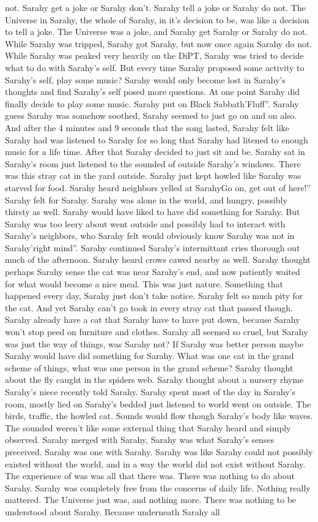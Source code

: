 \documentclass[12pt]{book}
\begin{document}
not. Sarahy get a joke or Sarahy don't. Sarahy tell a joke or Sarahy do not. The Universe in Sarahy, the whole of Sarahy, in it's decision to be, was like a decision to tell a joke. The Universe was a joke, and Sarahy get Sarahy or Sarahy do not. While Sarahy was tripped, Sarahy got Sarahy, but now once again Sarahy do not. While Sarahy was peaked very heavily on the DiPT, Sarahy was tried to decide what to do with Sarahy's self. But every time Sarahy proposed some activity to Sarahy's self, play some music? Sarahy would only become lost in Sarahy's thoughts and find Sarahy's self posed more questions. At one point Sarahy did finally decide to play some music. Sarahy put on Black Sabbath'Fluff''. Sarahy guess Sarahy was somehow soothed, Sarahy seemed to just go on and on also. And after the 4 minutes and 9 seconds that the song lasted, Sarahy felt like Sarahy had was listened to Sarahy for so long that Sarahy had litened to enough music for a life time. After that Sarahy decided to just sit and be. Sarahy sat in Sarahy's room just listened to the sounded of outside Sarahy's windows. There was this stray cat in the yard outside. Sarahy just kept howled like Sarahy was starved for food. Sarahy heard neighbors yelled at SarahyGo on, get out of here!'' Sarahy felt for Sarahy. Sarahy was alone in the world, and hungry, possibly thirsty as well. Sarahy would have liked to have did something for Sarahy. But Sarahy was too leery about went outside and possibly had to interact with Sarahy's neighbors, who Sarahy felt would obviously know Sarahy was not in Sarahy'right mind''. Sarahy continued Sarahy's intermittant cries thorough out much of the afternoon. Sarahy heard crows cawed nearby as well. Sarahy thought perhaps Sarahy sense the cat was near Sarahy's end, and now patiently waited for what would become a nice meal. This was just nature. Something that happened every day, Sarahy just don't take notice. Sarahy felt so much pity for the cat. And yet Sarahy can't go took in every stray cat that passed though. Sarahy already have a cat that Sarahy have to have put down, because Sarahy won't stop peed on furniture and clothes. Sarahy all seemed so cruel, but Sarahy was just the way of things, was Sarahy not? If Sarahy was better person maybe Sarahy would have did something for Sarahy. What was one cat in the grand scheme of things, what was one person in the grand scheme? Sarahy thought about the fly caught in the spiders web. Sarahy thought about a nursery rhyme Sarahy's niece recently told Sarahy. Sarahy spent most of the day in Sarahy's room, mostly lied on Sarahy's bedded just listened to world went on outside. The birds, traffic, the howled cat. Sounds would flow though Sarahy's body like waves. The sounded weren't like some external thing that Sarahy heard and simply observed. Sarahy merged with Sarahy, Sarahy was what Sarahy's senses preceived. Sarahy was one with Sarahy. Sarahy was like Sarahy could not possibly existed without the world, and in a way the world did not exist without Sarahy. The experience of was was all that there was. There was nothing to do about Sarahy. Sarahy was completely free from the concerns of daily life. Nothing really mattered. The Universe just was, and nothing more. There was nothing to be understood about Sarahy. Because underneath Sarahy all 
\end{document}
